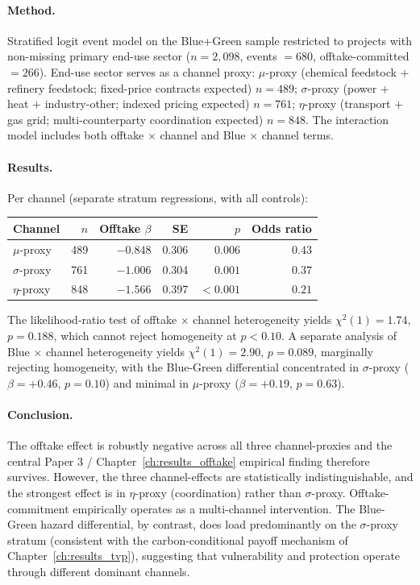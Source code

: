 \paragraph{Method.} Stratified logit event model on the Blue+Green sample restricted to projects with non-missing primary end-use sector ($n=2{,}098$, events $=680$, offtake-committed $=266$). End-use sector serves as a channel proxy: $\mu$-proxy (chemical feedstock $+$ refinery feedstock; fixed-price contracts expected) $n=489$; $\sigma$-proxy (power $+$ heat $+$ industry-other; indexed pricing expected) $n=761$; $\eta$-proxy (transport $+$ gas grid; multi-counterparty coordination expected) $n=848$. The interaction model includes both offtake $\times$ channel and Blue $\times$ channel terms.

\paragraph{Results.} Per channel (separate stratum regressions, with all controls):
\begin{center}
\begin{tabular}{lrrrrr}
\toprule
Channel & $n$ & Offtake $\beta$ & SE & $p$ & Odds ratio \\
\midrule
$\mu$-proxy   & 489 & $-0.848$ & 0.306 & $0.006$  & $0.43$ \\
$\sigma$-proxy & 761 & $-1.006$ & 0.304 & $0.001$  & $0.37$ \\
$\eta$-proxy  & 848 & $-1.566$ & 0.397 & $<0.001$ & $0.21$ \\
\bottomrule
\end{tabular}
\end{center}
The likelihood-ratio test of offtake $\times$ channel heterogeneity yields $\chi^2(1) = 1.74$, $p = 0.188$, which cannot reject homogeneity at $p<0.10$. A separate analysis of Blue $\times$ channel heterogeneity yields $\chi^2(1) = 2.90$, $p = 0.089$, marginally rejecting homogeneity, with the Blue-Green differential concentrated in $\sigma$-proxy ($\beta = +0.46$, $p = 0.10$) and minimal in $\mu$-proxy ($\beta = +0.19$, $p = 0.63$).

\paragraph{Conclusion.} The offtake effect is robustly negative across all three channel-proxies and the central Paper 3 / Chapter~\ref{ch:results_offtake} empirical finding therefore survives. However, the three channel-effects are statistically indistinguishable, and the strongest effect is in $\eta$-proxy (coordination) rather than $\sigma$-proxy. Offtake-commitment empirically operates as a multi-channel intervention. The Blue-Green hazard differential, by contrast, does load predominantly on the $\sigma$-proxy stratum (consistent with the carbon-conditional payoff mechanism of Chapter~\ref{ch:results_tvp}), suggesting that vulnerability and protection operate through different dominant channels.

